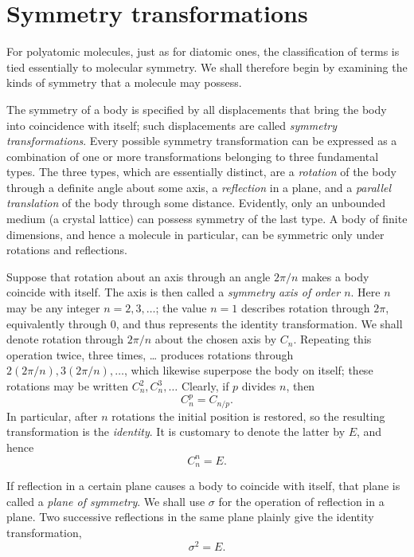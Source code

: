 \section{Symmetry transformations}

For polyatomic molecules, just as for diatomic ones, the classification of terms is tied essentially to molecular symmetry. We shall therefore begin by examining the kinds of symmetry that a molecule may possess.

The symmetry of a body is specified by all displacements that bring the body into coincidence with itself; such displacements are called \emph{symmetry transformations}. Every possible symmetry transformation can be expressed as a combination of one or more transformations belonging to three fundamental types. The three types, which are essentially distinct, are a \emph{rotation} of the body through a definite angle about some axis, a \emph{reflection} in a plane, and a \emph{parallel translation} of the body through some distance. Evidently, only an unbounded medium (a crystal lattice) can possess symmetry of the last type. A body of finite dimensions, and hence a molecule in particular, can be symmetric only under rotations and reflections.

Suppose that rotation about an axis through an angle $2\pi/n$ makes a body coincide with itself. The axis is then called a \emph{symmetry axis of order $n$}. Here $n$ may be any integer $n=2,3,\ldots$; the value $n=1$ describes rotation through $2\pi$, equivalently through 0, and thus represents the identity transformation. We shall denote rotation through $2\pi/n$ about the chosen axis by $C_n$. Repeating this operation twice, three times, \ldots{} produces rotations through $2(2\pi/n),3(2\pi/n),\ldots$, which likewise superpose the body on itself; these rotations may be written $C_n^2,C_n^3,\ldots$ Clearly, if $p$ divides $n$, then
\begin{equation}
C_n^p=C_{n/p}.
\tag{91.1}
\end{equation}
In particular, after $n$ rotations the initial position is restored, so the resulting transformation is the \emph{identity}. It is customary to denote the latter by $E$, and hence
\begin{equation}
C_n^n=E.
\tag{91.2}
\end{equation}

If reflection in a certain plane causes a body to coincide with itself, that plane is called a \emph{plane of symmetry}. We shall use $\sigma$ for the operation of reflection in a plane. Two successive reflections in the same plane plainly give the identity transformation,
\begin{equation}
\sigma^2=E.
\tag{91.3}
\end{equation}

